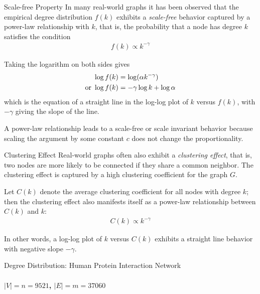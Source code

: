 \begin{frame}{Scale-free Property}
In many real-world graphs it has been observed that the
empirical degree
distribution $f(k)$ exhibits a {\em scale-free} behavior captured
by a power-law relationship with $k$, that is, the probability that
a node has degree $k$ satisf\/{i}es the condition
\begin{align*}
    f(k) \propto k^{-\gamma}
\end{align*}

\medskip


\medskip
Taking the logarithm on both sides gives
\begin{align*}
    \log f(k) & = \log (\alpha k^{-\gamma}) \notag\\
    \text{or } \log f(k) & = - \gamma \log k + \log \alpha
\end{align*}
which is the equation of a
straight line in the log-log plot of $k$ versus $f(k)$, with
$-\gamma$ giving the slope of the line. 

\medskip
A power-law relationship leads to a
scale-free or scale invariant
behavior because scaling the argument by some constant $c$
does not change the
proportionality.


\end{frame}


\begin{frame}{Clustering Effect}
Real-world graphs often also exhibit a {\em clustering effect}, that is,
two nodes are more likely to be connected if they share a common
neighbor. The clustering effect is captured by a high clustering
coeff\/{i}cient for the graph $G$. 

\medskip
Let $C(k)$ denote the \hbox{average}
clustering coeff\/{i}cient for all nodes with degree $k$; then the
clustering effect also manifests itself as a power-law
relationship between $C(k)$ and $k$:
\begin{align*}
    C(k) \propto k^{-\gamma}
\end{align*}

In other words, a log-log plot of $k$ versus $C(k)$ exhibits
a straight line behavior with negative slope $-\gamma$.

\end{frame}


\begin{frame}{Degree Distribution: Human Protein Interaction Network}
  \framesubtitle{$|V|=n=9521$, $|E|=m=37060$}
  \centerline{
    }%
\end{frame}



